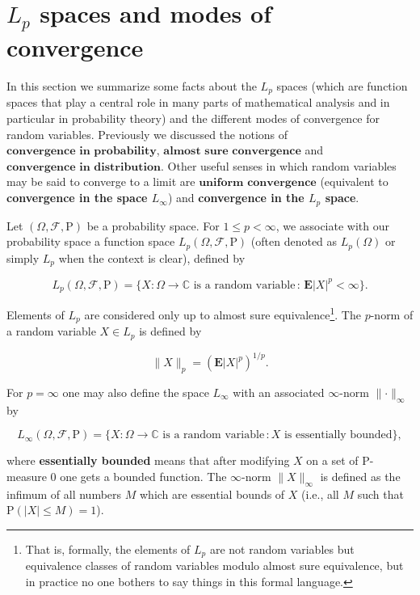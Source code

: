 \section{$L_p$ spaces and modes of convergence}
In this section we summarize some facts about the
$L_p$ spaces (which are function spaces that play a
central role in many parts of mathematical analysis
and in particular in probability theory) and the
different modes of convergence for random variables.
Previously we discussed the notions of
$\textbf{convergence in probability}$,
$\textbf{almost sure convergence}$ and
$\textbf{convergence in distribution}$. Other useful
senses in which random variables may be said to
converge to a limit are $\textbf{uniform convergence}$
(equivalent to \textbf{convergence in the space $L_\infty$})
and \textbf{convergence in the $L_p$ space}.

\begin{defn}
Let $(\Omega, \mathcal{F}, \mathrm{P})$ be a
probability space. For $1\le p<\infty$, we associate
with our probability space a function space
$L_p(\Omega, \mathcal{F}, \mathrm{P})$ (often denoted
as $L_p(\Omega)$ or simply $L_p$ when the context is
clear), defined by

\[
L_p(\Omega, \mathcal{F}, \mathrm{P}) = \{ X:\Omega\to\mathbb{C}\textrm{ is a random variable}\,:\, \mathbf{E}|X|^p < \infty \}.
\]

\noindent Elements of $L_p$ are considered only up to almost
sure equivalence\footnote{That is, formally, the elements of $L_p$ are not
random variables but equivalence classes of random
variables modulo almost sure equivalence, but in
practice no one bothers to say things in this formal
language.}. The $p$-norm of a
random variable $X\in L_p$ is defined by

\[
\lVert X\rVert_p = \left( \mathbf{E} |X|^p\right)^{1/p}.
\]

\noindent For $p=\infty$ one may also define the space
$L_\infty$ with an associated $\infty$-norm
$\lVert\cdot\rVert_\infty$ by

\[
L_\infty(\Omega,\mathcal{F},\mathrm{P}) = \{ X:\Omega\to\mathbb{C}\textrm{ is a random variable}\,: X\textrm{ is essentially bounded} \},
\]

\noindent where \textbf{essentially bounded} means that after
modifying $X$ on a set of $\mathrm{P}$-measure $0$
one gets a bounded function. The $\infty$-norm
$\lVert X\rVert_\infty$ is defined as the infimum of
all numbers $M$ which are essential bounds of $X$
(i.e., all $M$ such that $\mathrm{P}(|X|\le M)=1$).
\end{defn}


